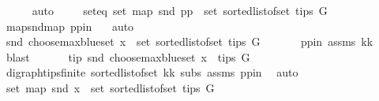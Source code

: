 \begin{isabellebody}
\ \ \ \ \isamarkupfalse%
\ auto\ \isanewline
\ \ \isamarkupfalse%
\ seteq{\isacharcolon}{\kern0pt}\ {\isachardoublequoteopen}set\ {\isacharparenleft}{\kern0pt}map\ snd\ pp{\isacharparenright}{\kern0pt}\ {\isacharequal}{\kern0pt}\ set\ {\isacharparenleft}{\kern0pt}sorted{\isacharunderscore}{\kern0pt}list{\isacharunderscore}{\kern0pt}of{\isacharunderscore}{\kern0pt}set\ {\isacharparenleft}{\kern0pt}tips\ G{\isacharparenright}{\kern0pt}{\isacharparenright}{\kern0pt}{\isachardoublequoteclose}\ \isanewline
\ \ \ \ \isamarkupfalse%
\ map{\isacharunderscore}{\kern0pt}snd{\isacharunderscore}{\kern0pt}map\ pp{\isacharunderscore}{\kern0pt}in\ \ \isamarkupfalse%
\ auto\isanewline
\ \ \isamarkupfalse%
\ \isamarkupfalse%
\ {\isachardoublequoteopen}snd\ {\isacharparenleft}{\kern0pt}choose{\isacharunderscore}{\kern0pt}max{\isacharunderscore}{\kern0pt}blue{\isacharunderscore}{\kern0pt}set\ x{\isacharparenright}{\kern0pt}\ {\isasymin}\ set\ {\isacharparenleft}{\kern0pt}sorted{\isacharunderscore}{\kern0pt}list{\isacharunderscore}{\kern0pt}of{\isacharunderscore}{\kern0pt}set\ {\isacharparenleft}{\kern0pt}tips\ G{\isacharparenright}{\kern0pt}{\isacharparenright}{\kern0pt}{\isachardoublequoteclose}\ \isanewline
\ \ \ \ \isamarkupfalse%
\ pp{\isacharunderscore}{\kern0pt}in\ assms{\isacharparenleft}{\kern0pt}{}{\isacharparenright}{\kern0pt}\ kk\ \isamarkupfalse%
\ blast\ \isanewline
\ \ \isamarkupfalse%
\ \isamarkupfalse%
\ tip{\isacharcolon}{\kern0pt}\ {\isachardoublequoteopen}snd\ {\isacharparenleft}{\kern0pt}choose{\isacharunderscore}{\kern0pt}max{\isacharunderscore}{\kern0pt}blue{\isacharunderscore}{\kern0pt}set\ x{\isacharparenright}{\kern0pt}\ {\isasymin}\ tips\ G{\isachardoublequoteclose}\isanewline
\ \ \ \ \isamarkupfalse%
\ digraph{\isachardot}{\kern0pt}tips{\isacharunderscore}{\kern0pt}finite\ sorted{\isacharunderscore}{\kern0pt}list{\isacharunderscore}{\kern0pt}of{\isacharunderscore}{\kern0pt}set{\isacharparenleft}{\kern0pt}{}{\isacharparenright}{\kern0pt}\ kk\ subs\ assms\ pp{\isacharunderscore}{\kern0pt}in\ \isamarkupfalse%
\ auto\isanewline
\ \ \isamarkupfalse%
\ {\isachardoublequoteopen}set\ {\isacharparenleft}{\kern0pt}map\ snd\ x{\isacharparenright}{\kern0pt}\ {\isacharequal}{\kern0pt}\ set\ {\isacharparenleft}{\kern0pt}sorted{\isacharunderscore}{\kern0pt}list{\isacharunderscore}{\kern0pt}of{\isacharunderscore}{\kern0pt}set\ {\isacharparenleft}{\kern0pt}tips\ G{\isacharparenright}{\kern0pt}{\isacharparenright}{\kern0pt}{\isachardoublequoteclose}\isanewline

\end{isabellebody}
